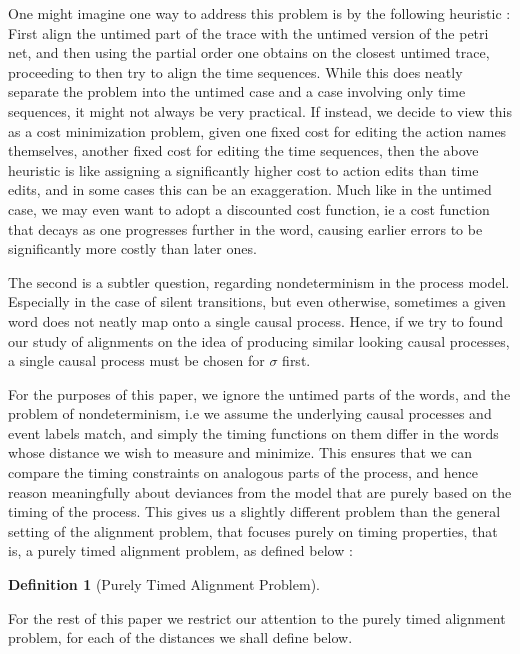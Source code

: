 \documentclass{article}
\newcounter{cases}
\theoremstyle{Definition}
\newtheorem{definition}{Definition}
\theoremstyle{definition}
\begin{document}
	One might imagine one way to address this problem is by the following heuristic : First align the untimed part of the trace with the untimed version of the petri net, and then using the partial order one obtains on the closest untimed trace, proceeding to then try to align the time sequences. 
	While this does neatly separate the problem into the untimed case and a case involving only time sequences, it might not always be very practical. 
	If instead, we decide to view this as a cost minimization problem, given one fixed cost for editing the action names themselves, another fixed cost for editing the time sequences, then the above heuristic is like assigning a significantly higher cost to action edits than time edits, and in some cases this can be an exaggeration. 
	Much like in the untimed case, we may even want to adopt a discounted cost function, ie a cost function that decays as one progresses further in the word, causing earlier errors to be significantly more costly than later ones. 
	
	The second is a subtler question, regarding nondeterminism in the process model. Especially in the case of silent transitions, but even otherwise, sometimes a given word does not neatly map onto a single causal process. Hence, if we try to found our study of alignments on the idea of producing similar looking causal processes, a single causal process must be chosen for $\sigma$ first. %
	
	For the purposes of this paper, we ignore the untimed parts of the words, and the problem of nondeterminism, i.e we assume the underlying causal processes and event labels match, and simply the timing functions on them differ in the words whose distance we wish to measure and minimize. 
	This ensures that we can compare the timing constraints on analogous parts of the process, and hence reason meaningfully about deviances from the model that are purely based on the timing of the process. This gives us a slightly different problem than the general setting of the alignment problem, that focuses purely on timing properties, that is, a purely timed alignment problem, as defined below : 
	
	\begin{definition}[Purely Timed Alignment Problem]
	\end{definition}

For the rest of this paper we restrict our attention to the purely timed alignment problem, for each of the distances we shall define below. 
	
\end{document}
